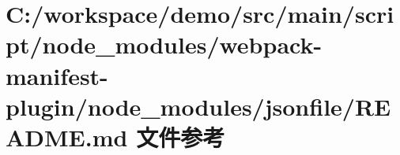\hypertarget{node__modules_2webpack-manifest-plugin_2node__modules_2jsonfile_2_r_e_a_d_m_e_8md}{}\section{C\+:/workspace/demo/src/main/script/node\+\_\+modules/webpack-\/manifest-\/plugin/node\+\_\+modules/jsonfile/\+R\+E\+A\+D\+ME.md 文件参考}
\label{node__modules_2webpack-manifest-plugin_2node__modules_2jsonfile_2_r_e_a_d_m_e_8md}
